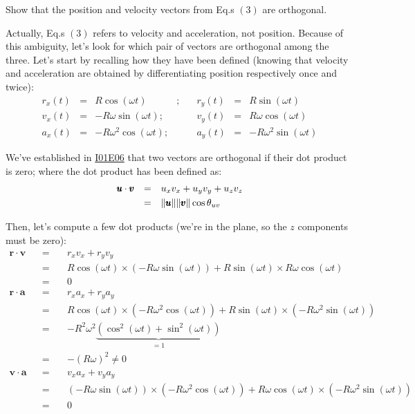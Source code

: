 \documentclass[solutions.tex]{subfiles}
\begin{document}
\maketitle
\begin{exercise} Show that the position and velocity
vectors from Eq.s $(3)$ are orthogonal.
\end{exercise}
Actually, Eq.s $(3)$ refers to velocity and acceleration,
not position. Because of this ambiguity, let's look for
which pair of vectors are orthogonal among the three.
Let's start by recalling how they have been defined (knowing
that velocity and acceleration are obtained by differentiating
position respectively once and twice):
\begin{equation*} \begin{aligned}
	r_x(t) &=& R\cos(\omega t)&;\quad& r_y(t) &=& R\sin(\omega t) \\
	v_x(t) &=& -R\omega\sin(\omega t);&\quad& v_y(t) &=& R\omega\cos(\omega t) \\
	a_x(t) &=& -R\omega^2\cos(\omega t);&\quad& a_y(t) &=& -R\omega^2\sin(\omega t)
\end{aligned} \end{equation*}

We've established in
\href{https://github.com/mbivert/ttm/blob/master/cm/I01E06.pdf}{I01E06}
that two vectors are orthogonal if their dot product is zero; where
the dot product has been defined as:
\begin{equation*} \begin{aligned}
	\pmb{u}\cdot\pmb{v} &&=\quad& u_xv_x + u_yv_y + u_zv_z \\
	~ &&=\quad& \lVert \pmb{u} \rVert\lVert \pmb{v} \rVert\cos\theta_{uv}
\end{aligned} \end{equation*}

Then, let's compute a few dot products (we're in the plane, so the
 $z$ components must be zero):
\begin{equation*} \begin{aligned}
	\bm{r}\cdot\bm{v} &&=\quad& r_xv_x + r_yv_y \\
	~ &&=\quad& R\cos(\omega t)\times(-R\omega\sin(\omega t))
		+ R\sin(\omega t)\times R\omega\cos(\omega t) \\
	~ &&=\quad& \boxed{0} \\
	\bm{r}\cdot\bm{a} &&=\quad& r_xa_x + r_ya_y \\
	~ &&=\quad& R\cos(\omega t)\times(-R\omega^2\cos(\omega t))
		+ R\sin(\omega t)\times(-R\omega^2\sin(\omega t)) \\
	~ &&=\quad& -R^2\omega^2\underbrace{
		(\cos^2(\omega t)+\sin^2(\omega t))
	}_{=1} \\
	~ &&=\quad& \boxed{-(R\omega)^2 \neq 0} \\
	\bm{v}\cdot\bm{a} &&=\quad& v_xa_x + v_ya_y \\
	~ &&=\quad& (-R\omega\sin(\omega t))\times(-R\omega^2\cos(\omega t))
		+ R\omega\cos(\omega t)\times(-R\omega^2\sin(\omega t)) \\
	~ &&=\quad& \boxed{0}
\end{aligned} \end{equation*}
\end{document}
